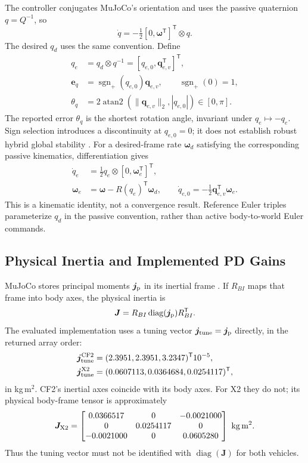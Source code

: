 \documentclass[letterpaper,10pt,conference]{IEEEtran}
\newcommand{\T}{^{\mathsf T}}
\newcommand{\sgnp}{\operatorname{sgn}_{+}}
\begin{document}
The controller conjugates MuJoCo's orientation and uses the passive
quaternion $q=Q^{-1}$, so
\begin{equation}
 \dot q=-\tfrac12[0,\bm\omega\T]\T\otimes q.
 \label{eq:passive}
\end{equation}
The desired $q_d$ uses the same convention. Define
\begin{align}
 q_e&=q_d\otimes q^{-1}=[q_{e,0},\bm q_{e,v}\T]\T,\\
 \bm e_q&=\sgnp(q_{e,0})\bm q_{e,v},\qquad \sgnp(0)=1,\\
 \theta_q&=2\operatorname{atan2}(\|\bm q_{e,v}\|_2,|q_{e,0}|)
             \in[0,\pi].
 \label{eq:theta}
\end{align}
The reported error $\theta_q$ is the shortest rotation angle, invariant
under $q_e\mapsto-q_e$. Sign selection introduces a discontinuity at
$q_{e,0}=0$; it does not establish robust hybrid global stability
\cite{mayhew2011hybrid}.
For a desired-frame rate $\bm\omega_d$ satisfying the corresponding
passive kinematics, differentiation gives
\begin{align}
 \dot q_e&=\tfrac12q_e\otimes[0,\bm\omega_e\T]\T,\\
 \bm\omega_e&=\bm\omega-R(q_e)\T\bm\omega_d,\qquad
 \dot q_{e,0}=-\tfrac12\bm q_{e,v}\T\bm\omega_e.
 \label{eq:errkin}
\end{align}
This is a kinematic identity, not a convergence result. Reference Euler
triples parameterize $q_d$ in the passive convention, rather than active
body-to-world Euler commands.

\subsection{Physical Inertia and Implemented PD Gains}
MuJoCo stores principal moments $\bm j_{\rm p}$ in its inertial frame
\cite{mujocoInertial}.
If $R_{BI}$ maps that frame into body axes, the physical inertia is
\begin{equation}
 \bm J=R_{BI}\operatorname{diag}(\bm j_{\rm p})R_{BI}\T.
 \label{eq:inertiaframe}
\end{equation}
The evaluated implementation uses a tuning vector
$\bm j_{\rm tune}=\bm j_{\rm p}$ directly, in the returned array order:
\begin{align*}
 \bm j_{\rm tune}^{\rm CF2}&=(2.3951,2.3951,3.2347)\T10^{-5},\\
 \bm j_{\rm tune}^{\rm X2}&=(0.0607113,0.0364684,0.0254117)\T,
\end{align*}
in kg\,m$^2$. CF2's inertial axes coincide with its body axes. For X2
they do not; its physical body-frame tensor is approximately
\begin{equation}
 \bm J_{\rm X2}=\begin{bmatrix}
 0.0366517&0&-0.0021000\\
 0&0.0254117&0\\
 -0.0021000&0&0.0605280
 \end{bmatrix}\ \mathrm{kg\,m^2}.
\end{equation}
Thus the tuning vector must not be identified with
$\operatorname{diag}(\bm J)$ for both vehicles.
\end{document}

